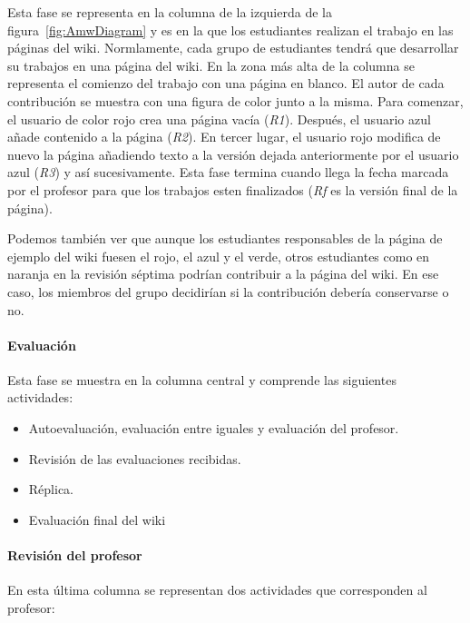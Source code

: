 Esta fase se representa en la columna de la izquierda de la figura~\ref{fig:AmwDiagram} y es en la que los estudiantes realizan el trabajo en las páginas del wiki. Normlamente, cada grupo de estudiantes tendrá que desarrollar su trabajos en una página del wiki. En la zona más alta de la columna se representa el comienzo del trabajo con una página en blanco. El autor de cada contribución se muestra con una figura de color junto a la misma. Para comenzar, el usuario de color rojo crea una página vacía (\emph{R1}). Después, el usuario azul añade contenido a la página (\emph{R2}). En tercer lugar, el usuario rojo modifica de nuevo la página añadiendo texto a la versión dejada anteriormente por el usuario azul (\emph{R3}) y así sucesivamente. Esta fase termina cuando llega la fecha marcada por el profesor para que los trabajos esten finalizados (\emph{Rf} es la versión final de la página).

Podemos también ver que aunque los estudiantes responsables de la página de ejemplo del wiki fuesen el rojo, el azul y el verde, otros estudiantes como en naranja en la revisión séptima podrían contribuir a la página del wiki. En ese caso, los miembros del grupo decidirían si la contribución debería conservarse o no.

\paragraph*{Evaluación}

Esta fase se muestra en la columna central y comprende las siguientes actividades:

\begin{itemize}
\item Autoevaluación, evaluación entre iguales y evaluación del profesor.
\item Revisión de las evaluaciones recibidas.
\item Réplica.
\item Evaluación final del wiki
\end{itemize}

\paragraph*{Revisión del profesor}

En esta última columna se representan dos actividades que corresponden al profesor:

